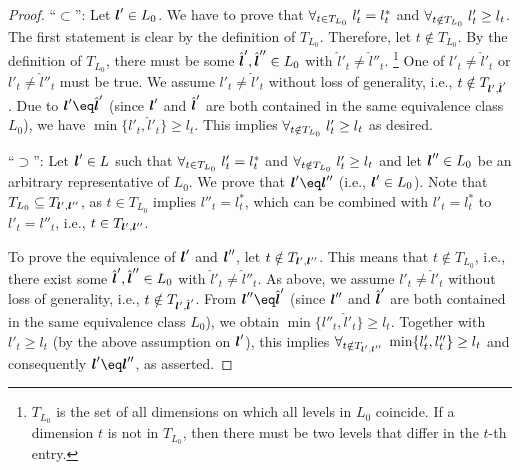 \begin{proof}
  ``$\subset$'':
  Let ${\boldsymbol{l}}' \in L_0$.
  We have to prove that
  $\forall_{t \in T_{L_0}}\;l'_t = l^\ast_t$ and
  $\forall_{t \notin T_{L_0}}\;l'_t \ge l_t$.
  The first statement is clear by the definition of $T_{L_0}$.
  Therefore, let $t \notin T_{L_0}$.
  By the definition of $T_{L_0}$,
  there must be some $\hat{{\boldsymbol{l}}}', \hat{{\boldsymbol{l}}}'' \in L_0$ with
  $\hat{l}'_t \not= \hat{l}''_t$.%
  \footnote{%
    $T_{L_0}$ is the set of all dimensions on which all levels
    in $L_0$ coincide.
    If a dimension $t$ is not in $T_{L_0}$, then there must be two levels
    that differ in the $t$-th entry.%
  }
  One of $l'_t \not= \hat{l}'_t$ or $l'_t \not= \hat{l}''_t$ must be true.
  We assume $l'_t \not= \hat{l}'_t$ without loss of generality, i.e.,
  $t \notin T_{{\boldsymbol{l}}',\hat{{\boldsymbol{l}}}'}$.
  Due to $\*l' \eq \hat{\*l}'$
  (since ${\boldsymbol{l}}'$ and $\hat{{\boldsymbol{l}}}'$ are both contained in the same
  equivalence class $L_0$),
  we have $\min\{l'_t, \hat{l}'_t\} \ge l_t$.
  This implies $\forall_{t \notin T_{L_0}}\;l'_t \ge l_t$ as desired.
  
  ``$\supset$'':
  Let ${\boldsymbol{l}}' \in L$ such that
  $\forall_{t \in T_{L_0}}\;l'_t = l^\ast_t$ and
  $\forall_{t \notin T_{L_0}}\;l'_t \ge l_t$
  and let ${\boldsymbol{l}}'' \in L_0$ be an arbitrary representative of $L_0$.
  We prove that $\*l' \eq \*l''$ (i.e., ${\boldsymbol{l}}' \in L_0$).
  Note that $T_{L_0} \subseteq T_{{\boldsymbol{l}}',{\boldsymbol{l}}''}$,
  as $t \in T_{L_0}$ implies
  $l''_t = l^\ast_t$, which can be combined with $l'_t = l^\ast_t$
  to $l'_t = l''_t$, i.e., $t \in T_{{\boldsymbol{l}}',{\boldsymbol{l}}''}$.
  
  To prove the equivalence of ${\boldsymbol{l}}'$ and ${\boldsymbol{l}}''$,
  let $t \notin T_{{\boldsymbol{l}}',{\boldsymbol{l}}''}$.
  This means that $t \notin T_{L_0}$, i.e.,
  there exist some
  $\hat{{\boldsymbol{l}}}', \hat{{\boldsymbol{l}}}'' \in L_0$ with
  $\hat{l}'_t \not= \hat{l}''_t$.
  As above, we assume $l'_t \not= \hat{l}'_t$ without loss of generality, i.e.,
  $t \notin T_{{\boldsymbol{l}}',\hat{{\boldsymbol{l}}}'}$.
  From $\*l'' \eq \hat{\*l}'$
  (since ${\boldsymbol{l}}''$ and $\hat{{\boldsymbol{l}}}'$ are both contained in the same
  equivalence class $L_0$),
  we obtain $\min\{l''_t, \hat{l}'_t\} \ge l_t$.
  Together with $l'_t \ge l_t$ (by the above assumption on ${\boldsymbol{l}}'$),
  this implies
  $\forall_{t \notin T_{{\boldsymbol{l}}',{\boldsymbol{l}}''}}\;\min\{l'_t, l''_t\} \ge l_t$
  and consequently $\*l' \eq \*l''$,
  as asserted.
\end{proof}

\propCombiTechniqueZero*

